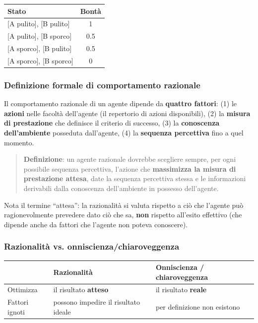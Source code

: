 \documentclass[11pt,a4paper]{report}
\begin{document}
\begin{center}
\begin{tabular}{@{}lc@{}}
\toprule
\textbf{Stato} & \textbf{Bontà} \\
\midrule
{}[A pulito], [B pulito] & 1 \\
{}[A pulito], [B sporco] & 0.5 \\
{}[A sporco], [B pulito] & 0.5 \\
{}[A sporco], [B sporco] & 0 \\
\bottomrule
\end{tabular}
\end{center}

\subsubsection*{Definizione formale di comportamento razionale}

Il comportamento razionale di un agente dipende da \textbf{quattro fattori}: (1) le \textbf{azioni} nelle facoltà dell'agente (il repertorio di azioni disponibili), (2) la \textbf{misura di prestazione} che definisce il criterio di successo, (3) la \textbf{conoscenza dell'ambiente} posseduta dall'agente, (4) la \textbf{sequenza percettiva} fino a quel momento.

\begin{quote}
\textbf{Definizione}: un agente razionale dovrebbe scegliere sempre, per ogni possibile sequenza percettiva, l'azione che \textbf{massimizza la misura di prestazione attesa}, date la sequenza percettiva stessa e le informazioni derivabili dalla conoscenza dell'ambiente in possesso dell'agente.
\end{quote}

Nota il termine ``attesa'': la razionalità si valuta rispetto a ciò che l'agente può ragionevolmente prevedere dato ciò che sa, \textbf{non} rispetto all'esito effettivo (che dipende anche da fattori che l'agente non poteva conoscere).

\subsubsection*{Razionalità vs. onniscienza/chiaroveggenza}

\begin{center}
\begin{tabular}{@{}lll@{}}
\toprule
 & \textbf{Razionalità} & \textbf{Onniscienza / chiaroveggenza} \\
\midrule
Ottimizza & il risultato \textbf{atteso} & il risultato \textbf{reale} \\
Fattori ignoti & possono impedire il risultato ideale & per definizione non esistono \\
\bottomrule
\end{tabular}
\end{center}
\end{document}
